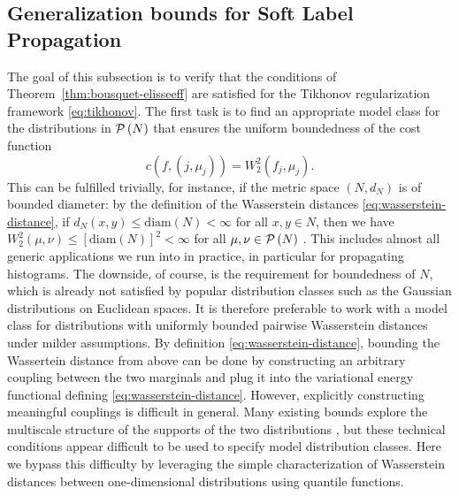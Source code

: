 \documentclass[letterpaper]{article} %
\begin{document}
\subsection{Generalization bounds for Soft Label Propagation} 
The goal of this subsection is to verify that the conditions of Theorem~\ref{thm:bousquet-elisseeff} are satisfied for the Tikhonov regularization framework \eqref{eq:tikhonov}.
The first task is to find an appropriate model class for the distributions in $\P\left( N \right)$ that ensures the uniform boundedness of the cost function
\begin{equation}
  \label{eq:wasserstein-cost-func}
    c\left( f, \left( j,\mu_j \right) \right)=W_2^2 \left( f_j,\mu_j \right).
\end{equation}
This can be fulfilled trivially, for instance, if the metric space $\left( N,d_N \right)$ is of bounded diameter: by the definition of the Wasserstein distances \eqref{eq:wasserstein-distance}, if $d_N \left( x,y \right)\leq \mathrm{diam}\left( N \right)<\infty$ for all $x,y\in N$, then we have $W_2^2 \left( \mu,\nu \right)\leq \left[\mathrm{diam}\left( N \right)\right]^2<\infty$ for all $\mu,\nu\in \P\left( N \right)$ .
This includes almost all generic applications we run into in practice, in particular for propagating histograms. The downside, of course, is the requirement for boundedness of $N$, which is already not satisfied by popular distribution classes such as the Gaussian distributions on Euclidean spaces. It is therefore preferable to work with a model class for distributions with uniformly bounded pairwise Wasserstein distances under milder assumptions. By definition \eqref{eq:wasserstein-distance}, bounding the Wassertein distance from above can be done by constructing an arbitrary coupling between the two marginals and plug it into the variational energy functional defining \eqref{eq:wasserstein-distance}. However, explicitly constructing meaningful couplings is difficult in general. Many existing bounds explore the multiscale structure of the supports of the two distributions \cite{David1988,Lei2018,SP2018}, but these technical conditions appear difficult to be used to specify model distribution classes. Here we bypass this difficulty by leveraging the simple characterization of Wasserstein distances between one-dimensional distributions using quantile functions.
\end{document}
